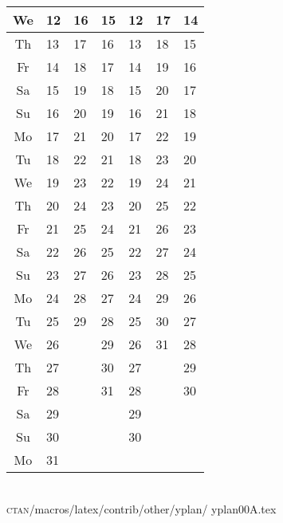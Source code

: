 \documentclass[a4paper]{article}
\def\Mo{Mo}
\def\Tu{Tu}
\def\We{We}
\def\Th{Th}
\def\Fr{Fr}
\def\Sa{Sa}
\def\Su{Su}
\newcommand{\datestrut}{\rule{0pt}{12pt}}
\begin{document}
\begin{table}
\begin{tabular}{|c||p{2.5cm}|p{2.5cm}|p{2.5cm}|p{2.5cm}|p{2.5cm}|p{2.5cm}|}
\hline
\datestrut \We & 12  &16   & 15  & 12  & 17    & 14    \\
\hline
\datestrut \Th & 13  &17   & 16  & 13  & 18    & 15    \\
\hline
\datestrut \Fr & 14  &18   & 17  & 14  & 19    & 16    \\
\hline
\datestrut \Sa & 15  &19   & 18  & 15  & 20    & 17    \\
\hline
\datestrut \Su & 16  &20   & 19  & 16  & 21    & 18    \\
\hline \hline
\datestrut \Mo & 17  &21   & 20  & 17  & 22    & 19    \\
\hline
\datestrut \Tu & 18  &22   & 21  & 18  & 23    & 20    \\
\hline
\datestrut \We & 19  &23   & 22  & 19  & 24    & 21    \\
\hline
\datestrut \Th & 20  &24   & 23  & 20  & 25    & 22    \\
\hline
\datestrut \Fr & 21  &25   & 24  & 21  & 26    & 23    \\
\hline
\datestrut \Sa & 22  &26   & 25  & 22  & 27    & 24    \\
\hline
\datestrut \Su & 23  &27   & 26  & 23  & 28    & 25    \\
\hline \hline
\datestrut \Mo & 24  &28   & 27  & 24  & 29    & 26    \\
\hline
\datestrut \Tu & 25  &29   & 28  & 25  & 30    & 27    \\
\hline
\datestrut \We & 26  &     & 29  & 26  & 31    & 28    \\
\cline{1-2}\cline{4-7}
\datestrut \Th & 27  &     & 30  & 27  &       & 29    \\
\cline{1-2}\cline{4-5}\cline{7-7}
\datestrut \Fr & 28  &     & 31  & 28  &       & 30    \\
\cline{1-2}\cline{4-5}\cline{7-7}
\datestrut \Sa & 29  &     &     & 29  &       &       \\
\cline{1-2}\cline{5-5}
\datestrut \Su & 30  &     &     & 30  &       &       \\
\hline\hline
\datestrut \Mo & 31  &     &     &     &       &       \\
\hline
\end{tabular}
{\ } \\
\textsc{ctan}/macros/latex/contrib/other/yplan/%
yplan00A.tex%
\end{table}
\end{document}
